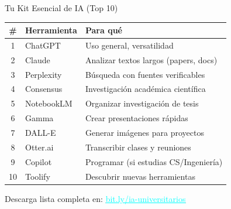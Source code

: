 \documentclass[aspectratio=169,xcolor={dvipsnames}]{beamer}
\newcommand{\enlace}[2]{\href{#1}{\textcolor{cyan}{\underline{#2}}}}
\begin{document}
	\begin{frame}{Tu Kit Esencial de IA (Top 10)}
		
		\begin{table}
			\centering
			\begin{tabular}{clp{5cm}}
				\toprule
				\# & \textbf{Herramienta} & \textbf{Para qué} \\
				\midrule
				1 & ChatGPT & Uso general, versatilidad \\
				2 & Claude & Analizar textos largos (papers, docs) \\
				3 & Perplexity & Búsqueda con fuentes verificables \\
				4 & Consensus & Investigación académica científica \\
				5 & NotebookLM & Organizar investigación de tesis \\
				6 & Gamma & Crear presentaciones rápidas \\
				7 & DALL-E & Generar imágenes para proyectos \\
				8 & Otter.ai & Transcribir clases y reuniones \\
				9 & Copilot & Programar (si estudias CS/Ingeniería) \\
				10 & Toolify & Descubrir nuevas herramientas \\
				\bottomrule
			\end{tabular}
		\end{table}
		
		\vspace{0.3cm}
		\centering
		\footnotesize
		Descarga lista completa en: \enlace{https://bit.ly/ia-universitarios}{bit.ly/ia-universitarios}
		
	\end{frame}
	
\end{document}
